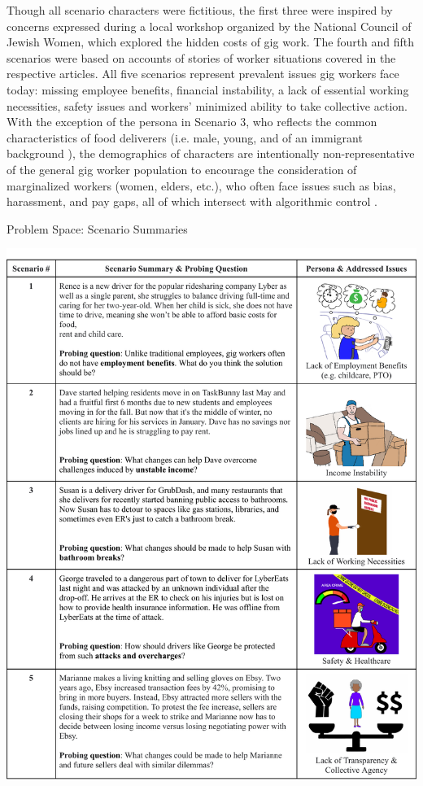 Though all scenario characters were fictitious, the first three were inspired by concerns expressed during a local workshop organized by the National Council of Jewish Women, which explored the hidden costs of gig work. The fourth \cite{Al_Jazeera2022-vz} and fifth \cite{noauthor_undated-xr} scenarios were based on accounts of stories of worker situations covered in the respective articles. All five scenarios represent prevalent issues gig workers face today: missing employee benefits, financial instability, a lack of essential working necessities, safety issues and workers' minimized ability to take collective action. With the exception of the persona in Scenario 3, who reflects the common characteristics of food deliverers (i.e. male, young, and of an immigrant background \cite{ma2022brush}), the demographics of characters are intentionally non-representative of the general gig worker population to encourage the consideration of marginalized workers (women, elders, etc.), who often face issues such as bias, harassment, and pay gaps, all of which intersect with algorithmic control \cite{ma2022brush, anjali2021watched, foong2021understanding, still, jahanbakhsh2020experimental}.

\FloatBarrier
\begin{table}[h!]
  \centering
   \caption{Problem Space: Scenario Summaries}
    \includegraphics[width=\textwidth]{Chapters/ch4/scenarios.pdf}
  \label{tab:scenarios}
\end{table}
\FloatBarrier

